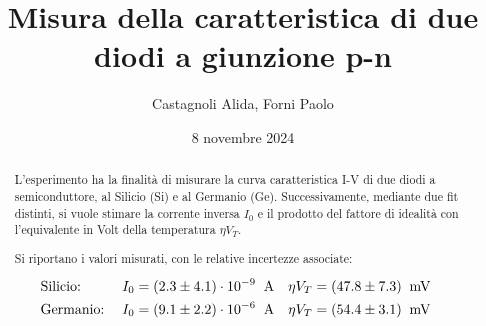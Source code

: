 \documentclass[11pt]{article}
\begin{document}
\title{\textbf{Misura della caratteristica di due diodi a giunzione p-n}}
\author{Castagnoli Alida, Forni Paolo}
\date{8 novembre 2024}
\maketitle


\vspace{-23pt}  %

\begin{abstract}
  L'esperimento ha la finalità di misurare la curva caratteristica \mbox{I-V} di due diodi a semiconduttore,
  al Silicio (Si) e al Germanio (Ge).
  Successivamente, mediante due fit distinti, si vuole stimare la corrente inversa $I_{0}$ e il prodotto del
  fattore di idealità con l'equivalente in Volt della temperatura $\eta V_{T}$.

  \noindent Si riportano i valori misurati, con le relative incertezze associate:
  
  \begin{align*}
    &\textnormal{Silicio:} \;
    &I_{0} &= (2.3 \pm 4.1)\cdot 10^{-9} \;\;\textnormal{A} &
    \eta V_{T} &= (47.8 \pm 7.3)\;\;\textnormal{mV} & \\
    &\textnormal{Germanio:} \;
    &I_{0} &= (9.1 \pm 2.2) \cdot 10^{-6} \;\;\textnormal{A} &
    \eta V_{T} &= (54.4 \pm 3.1)\;\;\textnormal{mV} &
  \end{align*}

\end{abstract}

\vspace{0.1cm}

\newpage



\clearpage
\appendix

\end{document}

